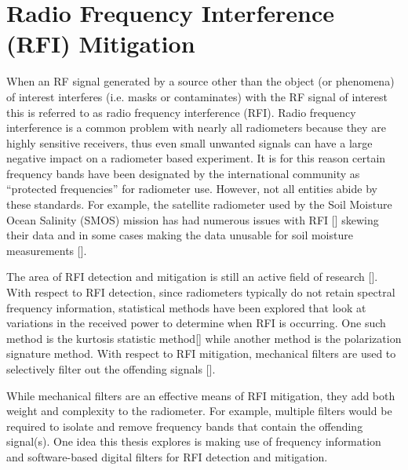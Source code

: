 \section{Radio Frequency Interference (RFI) Mitigation}
When an RF signal generated by a source other than the object (or phenomena) of interest interferes (i.e. masks or contaminates) with the RF signal of interest this is referred to as radio frequency interference (RFI).  Radio frequency interference is a common problem with nearly all radiometers because they are highly sensitive receivers, thus even small unwanted signals can have a large negative impact on a radiometer based experiment.  It is for this reason certain frequency bands have been designated by the international community as ``protected frequencies'' for radiometer use.  However, not all entities abide by these standards.  For example, the satellite radiometer used by the Soil Moisture Ocean Salinity (SMOS) mission has had numerous issues with RFI [\cite{Kerr}] skewing their data and in some cases making the data unusable for soil moisture measurements [\cite{Richaume}].  

The area of RFI detection and mitigation is still an active field of research [\cite{Forte}].  With respect to RFI detection, since radiometers typically do not retain spectral frequency information, statistical methods have been explored that look at variations in the received power to determine when RFI is occurring.  One such method is the kurtosis statistic method[\cite{DeRoo}] while another method is the polarization signature method.  With respect to RFI mitigation, mechanical filters are used to selectively filter out the offending signals [\cite{DeRooRFI}].  

While mechanical filters are an effective means of RFI mitigation, they add both weight and complexity to the radiometer.  For example, multiple filters would be required to isolate and remove frequency bands that contain the offending signal(s).  One idea this thesis explores is making use of frequency information and software-based digital filters for RFI detection and mitigation.



